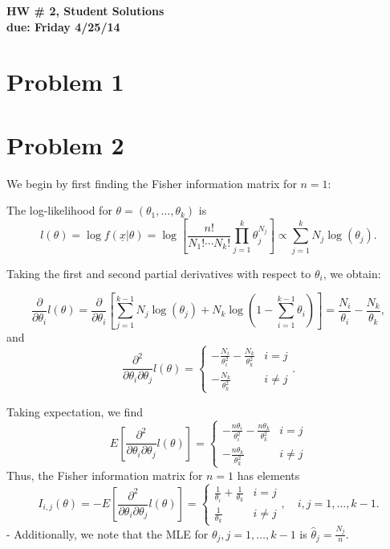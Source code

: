 \documentclass[12pt]{exam}
\begin{document}
\pagestyle{headandfoot} 
       {\bf \flushright HW \# 2, Student Solutions \\}
       {\bf \flushright due: Friday 4/25/14}
\headrule \footrule

\section*{Problem 1}
%
%
\section*{Problem 2}
%
We begin by first finding the Fisher information matrix for $n=1$: \newline 
		
		The log-likelihood for $\theta = (\theta_1, \dots, \theta_k)$ is 
		$$l(\theta) = \log f(\underline{x}|\theta) = \log \left[\frac{n!}{N_1! \cdots N_k!}\prod_{j=1}^k\theta_j^{N_j}  \right ] \propto \sum_{j=1}^k N_j\log(\theta_j).$$  
		
		Taking the first and second partial derivatives with respect to $\theta_i$, we obtain:
			
			$$\frac{\partial }{\partial \theta_i}l(\theta) = \frac{\partial }{\partial \theta_i}\left[ \sum_{j=1}^{k-1} N_j\log(\theta_j) + N_k \log \left(1- \sum_{i=1}^{k-1}\theta_i\right) \right] = \frac{N_i}{\theta_i} - \frac{N_k}{\theta_k}, $$
			and 
			$$\frac{\partial^2}{\partial \theta_i \partial \theta_j}l(\theta) = \left \{\begin{array}{cc} -\frac{N_i}{\theta^2_i} - \frac{N_k}{\theta^2_k} & i = j \\ -\frac{N_k}{\theta_k^2} & i \neq j \end{array} \right. .$$

				Taking expectation, we find
				$$E\left[\frac{\partial^2}{\partial \theta_i \partial \theta_j}l(\theta) \right] = \left \{\begin{array}{cc} -\frac{n\theta_i}{\theta^2_i} - \frac{n\theta_k}{\theta^2_k} & i = j \\ -\frac{n\theta_k}{\theta_k^2} & i \neq j \end{array} \right.$$
			Thus, the Fisher information matrix for $n=1$ has elements 
			$$I_{i,j}(\theta) =  -E\left[\frac{\partial^2}{\partial \theta_i \partial \theta_j}l(\theta) \right] = \left \{\begin{array}{cc} \frac{1}{\theta_i} + \frac{1}{\theta_k} & i = j \\ \frac{1}{\theta_k} & i \neq j \end{array} \right. , \quad i,j = 1, \dots, k-1 .$$
	-	
		Additionally, we note that the MLE for $\theta_j, j=1, \dots, k-1$ is $\hat{\theta}_j = \frac{N_j}{n}$. \newline 
		
\end{document}
